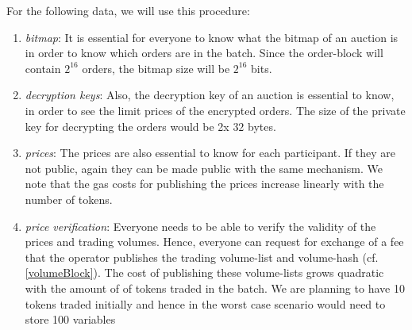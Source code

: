 \documentclass[11pt,parskip=full]{scrartcl}%
\begin{document}
For the following data, we will use this procedure:
\begin{enumerate}
\item \emph{bitmap}:
It is essential for everyone to know what the bitmap of an auction is in order to know which orders are in the batch. Since the order-block will contain $2^{16}$ orders, the bitmap size will be $2^{16}$ bits. 


\item \emph{decryption keys}:
Also, the decryption key of an auction is essential to know, in order to see the limit prices of the encrypted orders. 
The size of the private key for decrypting the orders would be 2x $32$ bytes.

\item \emph{prices}:
The prices are also essential to know for each participant. 
If they are not public, again they can be made public with the same mechanism. 
We note that the gas costs for publishing the prices increase linearly with the number of tokens.

\item \emph{price verification}:
Everyone needs to be able to verify the validity of the prices and trading volumes. Hence, everyone can request for exchange of a fee that the operator publishes the trading volume-list and volume-hash (cf. \ref{volumeBlock}). 
The cost of publishing these volume-lists grows quadratic with the amount of of tokens traded in the batch. We are planning to have 10 tokens traded initially and hence in the worst case scenario would need to store 100 variables 
\end{enumerate}
\end{document}
